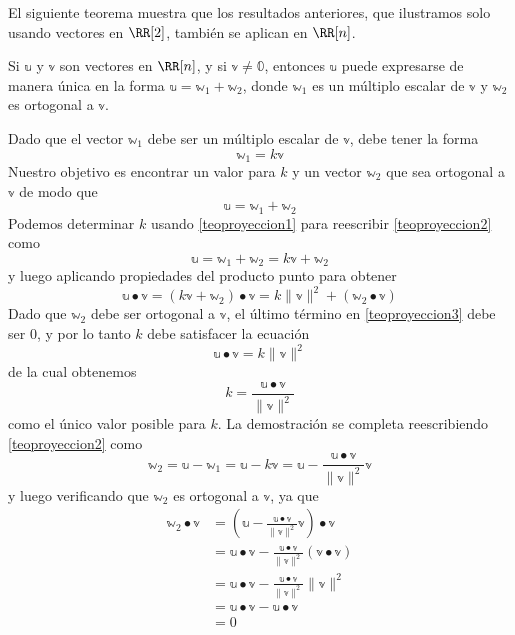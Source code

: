 El siguiente teorema muestra que los resultados anteriores, que ilustramos solo usando vectores en $\RR[2]$, también se aplican en $\RR[n]$.

\begin{theorem}{}{}
     Si $\mathbb{u}$ y $\mathbb{v}$ son vectores en $\RR[n]$, y si $\mathbb{v} \neq \mathbb{0}$, entonces $\mathbb{u}$ puede expresarse de manera única en la forma $\mathbb{u} = \mathbb{w}_1 + \mathbb{w}_2$, donde $\mathbb{w}_1$ es un múltiplo escalar de $\mathbb{v}$ y $\mathbb{w}_2$ es ortogonal a $\mathbb{v}$.

    \tcblower
    \demostracion Dado que el vector $\mathbb{w}_1$ debe ser un múltiplo escalar de $\mathbb{v}$, debe tener la forma
    \begin{equation}
        \mathbb{w}_1 = k\mathbb{v} \label{teoproyeccion1}
    \end{equation}
    Nuestro objetivo es encontrar un valor para $k$ y un vector $\mathbb{w}_2$ que sea ortogonal a $\mathbb{v}$ de modo que
    \begin{equation}
        \mathbb{u} = \mathbb{w}_1 + \mathbb{w}_2 \label{teoproyeccion2}
    \end{equation}
    Podemos determinar $k$ usando \eqref{teoproyeccion1} para reescribir \eqref{teoproyeccion2} como
    $$\mathbb{u} = \mathbb{w}_1 + \mathbb{w}_2 = k\mathbb{v} + \mathbb{w}_2$$
    y luego aplicando propiedades del producto punto para obtener
    \begin{equation}
        \mathbb{u} \bullet \mathbb{v} = (k\mathbb{v} + \mathbb{w}_2) \bullet \mathbb{v} = k\|\mathbb{v}\|^2 + (\mathbb{w}_2 \bullet \mathbb{v}) \label{teoproyeccion3}
    \end{equation}
    Dado que $\mathbb{w}_2$ debe ser ortogonal a $\mathbb{v}$, el último término en \eqref{teoproyeccion3} debe ser 0, y por lo tanto $k$ debe satisfacer la ecuación
    $$\mathbb{u} \bullet \mathbb{v} = k\|\mathbb{v}\|^2$$
    de la cual obtenemos
    $$k = \frac{\mathbb{u} \bullet \mathbb{v}}{\|\mathbb{v}\|^2}$$
    como el único valor posible para $k$. La demostración se completa reescribiendo \eqref{teoproyeccion2} como
    $$\mathbb{w}_2 = \mathbb{u} - \mathbb{w}_1 = \mathbb{u} - k\mathbb{v} = \mathbb{u} - \frac{\mathbb{u} \bullet \mathbb{v}}{\|\mathbb{v}\|^2}\mathbb{v}$$
    y luego verificando que $\mathbb{w}_2$ es ortogonal a $\mathbb{v}$, ya que
    \begin{align*}
        \mathbb{w}_2 \bullet \mathbb{v} & = \left(\mathbb{u} - \frac{\mathbb{u} \bullet \mathbb{v}}{\|\mathbb{v}\|^2} \mathbb{v}\right) \bullet \mathbb{v} \\
        & = \mathbb{u} \bullet \mathbb{v} -\frac{\mathbb{u} \bullet \mathbb{v}}{\|\mathbb{v}\|^2} (\mathbb{v} \bullet \mathbb{v}) \\
        & = \mathbb{u} \bullet \mathbb{v} -\frac{\mathbb{u} \bullet \mathbb{v}}{\|\mathbb{v}\|^2} \|\mathbb{v}\|^2 \\
        & = \mathbb{u} \bullet \mathbb{v} -\mathbb{u} \bullet \mathbb{v} \\
        & = 0
    \end{align*}
\end{theorem}

